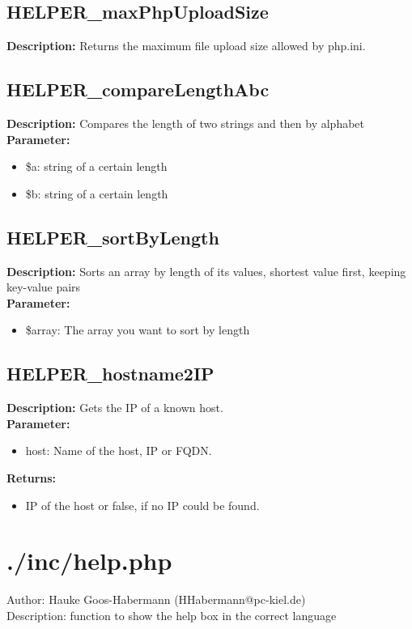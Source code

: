 \subsection{HELPER\_maxPhpUploadSize}
\textbf{Description:} Returns the maximum file upload size allowed by php.ini.\\

\subsection{HELPER\_compareLengthAbc}
\textbf{Description:} Compares the length of two strings and then by alphabet\\
\textbf{Parameter:}
\begin{itemize}
\item \$a: string of a certain length
\item \$b: string of a certain length
\end{itemize}

\subsection{HELPER\_sortByLength}
\textbf{Description:} Sorts an array by length of its values, shortest value first, keeping key-value pairs\\
\textbf{Parameter:}
\begin{itemize}
\item \$array: The array you want to sort by length
\end{itemize}

\subsection{HELPER\_hostname2IP}
\textbf{Description:} Gets the IP of a known host.\\
\textbf{Parameter:}
\begin{itemize}
\item host: Name of the host, IP or FQDN.
\end{itemize}
\textbf{Returns:}
\begin{itemize}
\item IP of the host or false, if no IP could be found.
\end{itemize}

\newpage\section{./inc/help.php}
 Author: Hauke Goos-Habermann (HHabermann@pc-kiel.de)\\
 Description: function to show the help box in the correct language\\

